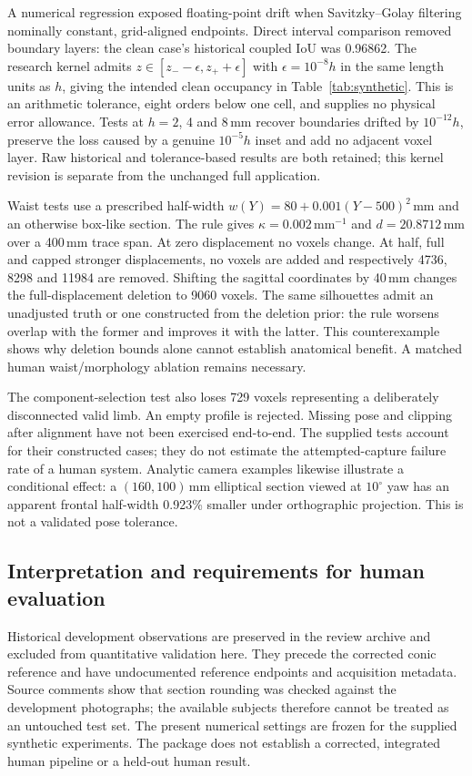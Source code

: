 \documentclass[11pt,a4paper]{article}
\begin{document}
A numerical regression exposed floating-point drift when Savitzky--Golay filtering nominally constant, grid-aligned endpoints. Direct interval comparison removed boundary layers: the clean case's historical coupled IoU was 0.96862. The research kernel admits $z\in[z_- -\epsilon,z_++\epsilon]$ with $\epsilon=10^{-8}h$ in the same length units as $h$, giving the intended clean occupancy in Table~\ref{tab:synthetic}. This is an arithmetic tolerance, eight orders below one cell, and supplies no physical error allowance. Tests at $h=2$, 4 and 8\,mm recover boundaries drifted by $10^{-12}h$, preserve the loss caused by a genuine $10^{-5}h$ inset and add no adjacent voxel layer. Raw historical and tolerance-based results are both retained; this kernel revision is separate from the unchanged full application.

Waist tests use a prescribed half-width $w(Y)=80+0.001(Y-500)^2$\,mm and an otherwise box-like section. The rule gives $\kappa=0.002$\,mm$^{-1}$ and $d=20.8712$\,mm over a 400\,mm trace span. At zero displacement no voxels change. At half, full and capped stronger displacements, no voxels are added and respectively 4736, 8298 and 11984 are removed. Shifting the sagittal coordinates by 40\,mm changes the full-displacement deletion to 9060 voxels. The same silhouettes admit an unadjusted truth or one constructed from the deletion prior: the rule worsens overlap with the former and improves it with the latter. This counterexample shows why deletion bounds alone cannot establish anatomical benefit. A matched human waist/morphology ablation remains necessary.

The component-selection test also loses 729 voxels representing a deliberately disconnected valid limb. An empty profile is rejected. Missing pose and clipping after alignment have not been exercised end-to-end. The supplied tests account for their constructed cases; they do not estimate the attempted-capture failure rate of a human system. Analytic camera examples likewise illustrate a conditional effect: a $(160,100)$\,mm elliptical section viewed at $10^\circ$ yaw has an apparent frontal half-width 0.923\% smaller under orthographic projection. This is not a validated pose tolerance.

\subsection{Interpretation and requirements for human evaluation}
Historical development observations are preserved in the review archive and excluded from quantitative validation here. They precede the corrected conic reference and have undocumented reference endpoints and acquisition metadata. Source comments show that section rounding was checked against the development photographs; the available subjects therefore cannot be treated as an untouched test set. The present numerical settings are frozen for the supplied synthetic experiments. The package does not establish a corrected, integrated human pipeline or a held-out human result.
\end{document}
